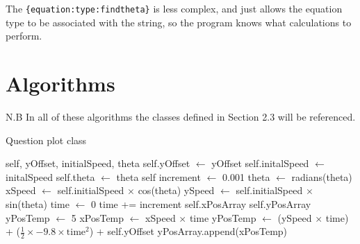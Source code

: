The \texttt{\{equation:type:findtheta\}} is less complex, and just allows the equation type to be associated with the string, so the program knows what calculations to perform.
\section{Algorithms}
N.B In all of these algorithms the classes defined in Section 2.3 will be referenced.
\iffalse\begin{algorithm}[h]
	\caption{Question plot class}
	\begin{algorithmic}
		 {}
			 {self, yOffset, initialSpeed, theta}
				\State self.yOffset $\gets$ yOffset
				\State self.initalSpeed $\gets$ initalSpeed
				\State self.theta $\gets$ theta
			\EndFunction
			 {self}
				\State increment $\gets$ 0.001
				\State theta $\gets$ radians(theta)
				\State xSpeed $\gets$ self.initialSpeed $\times$ cos(theta)
				\State ySpeed $\gets$ self.initialSpeed $\times$ sin(theta)
				\State time $\gets$ 0
				\State time += increment
				\State self.xPosArray
				\State self.yPosArray
				\State yPosTemp $\gets$ 5
					\State xPosTemp $\gets$ xSpeed $\times$ time
					\State yPosTemp $\gets$ (ySpeed $\times$ time) + ($\frac{1}{2} \times -9.8 \times \text{time}^2$) + self.yOffset
					\State yPosArray.append(xPosTemp)
				\EndWhile
			\EndFunction
		\EndProcedure
	\end{algorithmic}
\end{algorithm}

